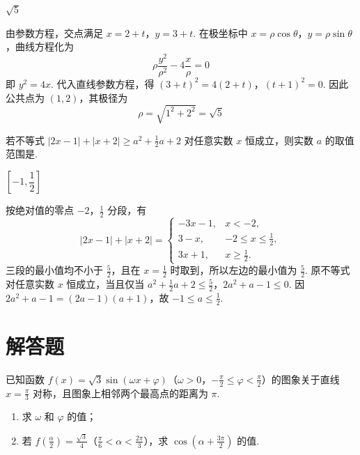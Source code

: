 \begin{answer}
\(\sqrt{5}\)
\end{answer}

\begin{solution}
由参数方程，交点满足 \(x=2+t\)，\(y=3+t\). 在极坐标中 \(x=\rho\cos\theta\)，\(y=\rho\sin\theta\)，曲线方程化为
\[
\rho\frac{y^{2}}{\rho^{2}}-4\frac{x}{\rho}=0
\]
即 \(y^{2}=4x\). 代入直线参数方程，得
\((3+t)^{2}=4(2+t)\)，\((t+1)^{2}=0\).
因此公共点为 \((1,2)\)，其极径为
\[
\rho=\sqrt{1^{2}+2^{2}}=\sqrt5
\]
\end{solution}

\begin{problem}
若不等式 \( \left|2x-1\right|+\left|x+2\right|\geqslant a^{2}+\frac{1}{2}a+2 \) 对任意实数 \(x\) 恒成立，则实数 \(a\) 的取值范围是\fillinblank{}.
\end{problem}

\begin{answer}
\(\left[-1, \dfrac{1}{2}\right]\)
\end{answer}

\begin{solution}
按绝对值的零点 \(-2\)，\(\frac12\) 分段，有
\[
|2x-1|+|x+2|=
\begin{cases}
-3x-1,&x<-2,\\
3-x,&-2\leqslant x\leqslant\frac12,\\
3x+1,&x\geqslant\frac12.
\end{cases}
\]
三段的最小值均不小于 \(\frac52\)，且在 \(x=\frac12\) 时取到，所以左边的最小值为 \(\frac52\). 原不等式对任意实数 \(x\) 恒成立，当且仅当
\(a^{2}+\frac12a+2\leqslant\frac52\)，\(2a^{2}+a-1\leqslant0\).
因 \(2a^{2}+a-1=(2a-1)(a+1)\)，故 \(-1\leqslant a\leqslant\frac12\).
\end{solution}

\section{解答题}

\begin{problem}
已知函数 \( f(x) = \sqrt{3}\sin (\omega x + \varphi) \)（\(\omega > 0\)，\(-\frac{\pi}{2} \leqslant \varphi < \frac{\pi}{2}\)）的图象关于直线 \( x = \frac{\pi}{3} \) 对称，且图象上相邻两个最高点的距离为 \( \pi \).

\begin{enumerate}
\item 求 \( \omega \) 和 \( \varphi \) 的值；
\item 若 \( f\left(\frac{\alpha}{2}\right) = \frac{\sqrt{3}}{4} \)（\(\frac{\pi}{6} < \alpha < \frac{2\pi}{3}\)），求 \( \cos \left(\alpha + \frac{3\pi}{2}\right) \) 的值.
\end{enumerate}
\end{problem}

